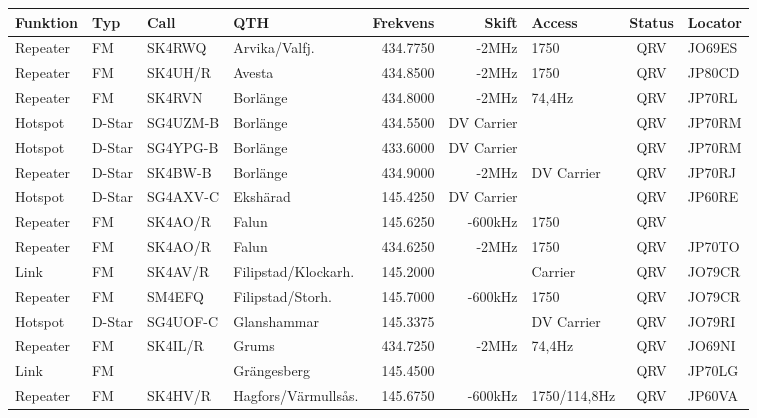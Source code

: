 \begin{longtable}{llllrrlcl}

\textbf{Funktion} & \textbf{Typ}    & \textbf{Call}   & \textbf{QTH} & \textbf{Frekvens} & 
\textbf{Skift}    & \textbf{Access} & \textbf{Status} & \textbf{Locator} \\ \hline \endhead

Repeater & FM     & SK4RWQ   & Arvika/Valfj.       & 434.7750 & -2MHz      & 1750            & QRV  & JO69ES \\
Repeater & FM     & SK4UH/R  & Avesta              & 434.8500 & -2MHz      & 1750            & QRV  & JP80CD \\
Repeater & FM     & SK4RVN   & Borlänge            & 434.8000 & -2MHz      & 74,4Hz          & QRV  & JP70RL \\
Hotspot  & D-Star & SG4UZM-B & Borlänge            & 434.5500 & DV Carrier &                 & QRV  & JP70RM \\
Hotspot  & D-Star & SG4YPG-B & Borlänge            & 433.6000 & DV Carrier &                 & QRV  & JP70RM \\
Repeater & D-Star & SK4BW-B  & Borlänge            & 434.9000 & -2MHz      & DV Carrier      & QRV  & JP70RJ \\
Hotspot  & D-Star & SG4AXV-C & Ekshärad            & 145.4250 & DV Carrier &                 & QRV  & JP60RE \\
Repeater & FM     & SK4AO/R  & Falun               & 145.6250 & -600kHz    & 1750            & QRV  &        \\
Repeater & FM     & SK4AO/R  & Falun               & 434.6250 & -2MHz      & 1750            & QRV  & JP70TO \\
Link     & FM     & SK4AV/R  & Filipstad/Klockarh. & 145.2000 &            & Carrier         & QRV  & JO79CR \\
Repeater & FM     & SM4EFQ   & Filipstad/Storh.    & 145.7000 & -600kHz    & 1750            & QRV  & JO79CR \\
Hotspot  & D-Star & SG4UOF-C & Glanshammar         & 145.3375 &            & DV Carrier      & QRV  & JO79RI \\
Repeater & FM     & SK4IL/R  & Grums               & 434.7250 & -2MHz      & 74,4Hz          & QRV  & JO69NI \\
Link     & FM     &          & Grängesberg         & 145.4500 &            &                 & QRV  & JP70LG \\
Repeater & FM     & SK4HV/R  & Hagfors/Värmullsås. & 145.6750 & -600kHz    & 1750/114,8Hz    & QRV  & JP60VA \\

\end{longtable}
